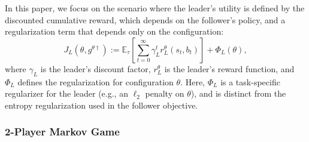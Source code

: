 \documentclass[letterpaper]{article} %
\providecommand{\E}{\mathbb{E}} %
\newtheorem{assumption}{Assumption}
\begin{document}
In this paper, we focus on the scenario where the leader's utility is defined by the discounted cumulative reward, which depends on the follower's policy, and a regularization term that depends only on the configuration:
\begin{equation}
    J_L({\theta}, g^{\theta\dagger}) := \E_\tau\left[ \sum_{t=0}^\infty \gamma_L^t r_L^{\theta}(s_t, b_t)\right] + \Phi_L({\theta}), \label{eq:leader-utility}
\end{equation}
where  $\gamma_L$ is the leader's discount factor, $r_L^{\theta}$ is the leader's reward function, and $\Phi_L$ defines the regularization for configuration ${\theta}$.
Here, $\Phi_L$ is a task-specific regularizer for the leader (e.g., an $\ell_2$ penalty on $\theta$), and is distinct from the entropy regularization used in the follower objective.



\subsubsection{2-Player Markov Game}
\end{document}
